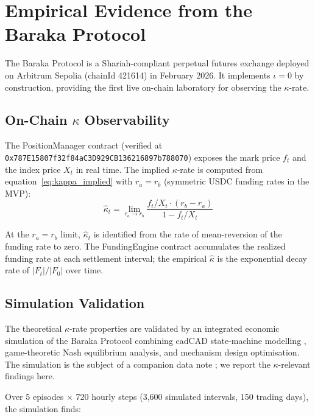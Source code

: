 \documentclass[10pt,twocolumn]{article}
\theoremstyle{plain}
\theoremstyle{definition}
\begin{document}
\section{Empirical Evidence from the Baraka Protocol}
\label{sec:empirical}

The Baraka Protocol \cite{Ahmed2026a} is a Shariah-compliant
perpetual futures exchange deployed on Arbitrum Sepolia
(chainId 421614) in February 2026. It implements $\iota = 0$ by
construction, providing the first live on-chain laboratory for
observing the $\kappa$-rate.

\subsection{On-Chain $\kappa$ Observability}

The PositionManager contract (verified at
\texttt{0x787E15807f32f84aC3D929CB136216897b788070})
exposes the mark price $f_t$ and the index price $X_t$ in
real time. The implied $\kappa$-rate is computed from
equation~\eqref{eq:kappa_implied} with $r_a = r_b$ (symmetric
USDC funding rates in the MVP):
\begin{equation}
\hat\kappa_t = \lim_{r_a \to r_b}
\frac{f_t/X_t \cdot (r_b - r_a)}{1 - f_t/X_t}
\label{eq:kappa_defi}
\end{equation}

At the $r_a = r_b$ limit, $\hat\kappa_t$ is identified from
the rate of mean-reversion of the funding rate to zero. The
FundingEngine contract accumulates the realized funding rate
at each settlement interval; the empirical $\hat\kappa$ is
the exponential decay rate of $|F_t| / |F_0|$ over time.

\subsection{Simulation Validation}

The theoretical $\kappa$-rate properties are validated by an
integrated economic simulation of the Baraka Protocol combining
cadCAD state-machine modelling \cite{Zargham2020}, game-theoretic
Nash equilibrium analysis, and mechanism design optimisation.
The simulation is the subject of a companion data note
\cite{Ahmed2026c}; we report the $\kappa$-relevant findings here.

Over 5 episodes $\times$ 720 hourly steps (3,600 simulated
intervals, 150 trading days), the simulation finds:
\end{document}
